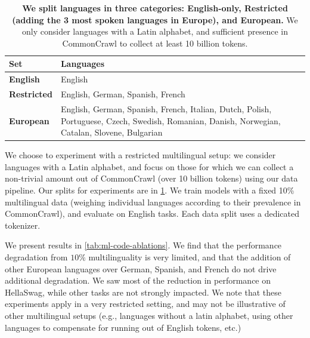\documentclass{article}
\begin{document}
\begin{table}[b]
\centering
\vspace{-0.3in}
\caption{\textbf{We split languages in three categories: English-only, Restricted (adding the 3 most spoken languages in Europe), and European.} We only consider languages with a Latin alphabet, and sufficient presence in CommonCrawl to collect at least 10 billion tokens.}
\vspace{0.1in}
\label{tab:ml-groups}
\begin{tabular}{lp{11cm}}
\toprule
\textbf{Set}        & \textbf{Languages}                                                                                                                             \\
\midrule
\textbf{English}    & English                                                                                                                                        \\
\textbf{Restricted} & English, German, Spanish, French                                                                                                               \\
\textbf{European}   & English, German, Spanish, French, Italian, Dutch, Polish, Portuguese, Czech, Swedish, Romanian, Danish, Norwegian, Catalan, Slovene, Bulgarian \\
\bottomrule
\end{tabular}
\end{table}


We choose to experiment with a restricted multilingual setup: we consider languages with a Latin alphabet, and focus on those for which we can collect a non-trivial amount out of CommonCrawl (over 10 billion tokens) using our data pipeline. Our splits for experiments are in \cref{tab:ml-groups}. We train models with a fixed 10\% multilingual data (weighing individual languages according to their prevalence in CommonCrawl), and evaluate on English tasks. Each data split uses a dedicated tokenizer.

We present results in \cref{tab:ml-code-ablations}. We find that the performance degradation from $10\%$ multilinguality is very limited, and that the addition of other European languages over German, Spanish, and French do not drive additional degradation. We saw most of the reduction in performance on HellaSwag, while other tasks are not strongly impacted. We note that these experiments apply in a very restricted setting, and may not be illustrative of other multilingual setups (e.g., languages without a latin alphabet, using other languages to compensate for running out of English tokens, etc.)
\end{document}
